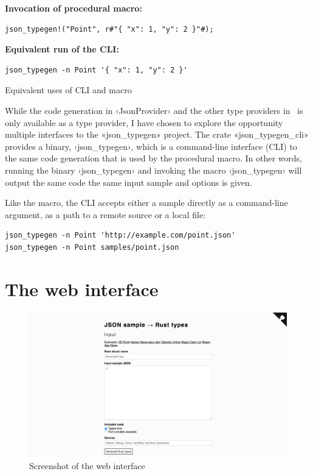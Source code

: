 \begin{listing}[ht!]
\textbf{Invocation of procedural macro:}
\begin{verbatim}
json_typegen!("Point", r#"{ "x": 1, "y": 2 }"#);
\end{verbatim}
\vspace{5mm}

\textbf{Equivalent run of the CLI:}
\begin{verbatim}
json_typegen -n Point '{ "x": 1, "y": 2 }'
\end{verbatim}
\caption{Equivalent uses of CLI and macro}
\label{lst:cli-and-macro}
\end{listing}

While the code generation in ‹JsonProvider› and the other type providers in \fsharpdata\ is only available as a type provider, I have chosen to explore the opportunity multiple interfaces to the «json_typegen» project. The crate «json_typegen_cli» provides a binary, ‹json_typegen›, which is a command-line interface (CLI) to the same code generation that is used by the procedural macro. In other words, running the binary ‹json_typegen› and invoking the macro ‹json_typegen› will output the same code the same input sample and options is given.

Like the macro, the CLI accepts either a sample directly as a command-line argument, as a path to a remote source or a local file:

\begin{verbatim}
json_typegen -n Point 'http://example.com/point.json'
json_typegen -n Point samples/point.json
\end{verbatim}


\section{The web interface}

\begin{figure}[ht!]
\includegraphics[width=\textwidth]{json_typegen_web}
\hspace*{-1.5in} %
\caption{Screenshot of the web interface}
\label{fig:web-screenshot}
\end{figure}

